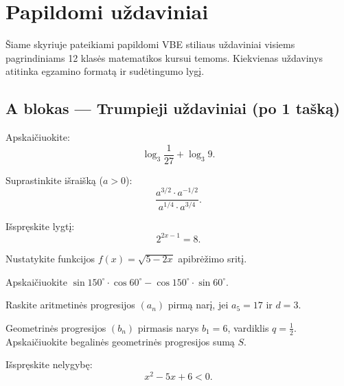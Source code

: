 \chapter{Papildomi uždaviniai}

Šiame skyriuje pateikiami papildomi VBE stiliaus uždaviniai visiems pagrindiniams
12 klasės matematikos kursui temoms. Kiekvienas uždavinys atitinka egzamino
formatą ir sudėtingumo lygį.

\section*{A blokas — Trumpieji uždaviniai (po 1 tašką)}

\begin{exercise}
Apskaičiuokite:
\[
\log_3 \frac{1}{27} + \log_3 9.
\]
\end{exercise}

\begin{exercise}
Suprastinkite išraišką ($a > 0$):
\[
\frac{a^{3/2} \cdot a^{-1/2}}{a^{1/4} \cdot a^{3/4}}.
\]
\end{exercise}

\begin{exercise}
Išspręskite lygtį:
\[
2^{2x-1} = 8.
\]
\end{exercise}

\begin{exercise}
Nustatykite funkcijos $f(x) = \sqrt{5 - 2x}$ apibrėžimo sritį.
\end{exercise}

\begin{exercise}
Apskaičiuokite $\sin 150^\circ \cdot \cos 60^\circ - \cos 150^\circ \cdot \sin 60^\circ$.
\end{exercise}

\begin{exercise}
Raskite aritmetinės progresijos $(a_n)$ pirmą narį, jei $a_5 = 17$ ir $d = 3$.
\end{exercise}

\begin{exercise}
Geometrinės progresijos $(b_n)$ pirmasis narys $b_1 = 6$, vardiklis $q = \tfrac{1}{2}$.
Apskaičiuokite begalinės geometrinės progresijos sumą $S$.
\end{exercise}

\begin{exercise}
Išspręskite nelygybę:
\[
x^2 - 5x + 6 < 0.
\]
\end{exercise}

